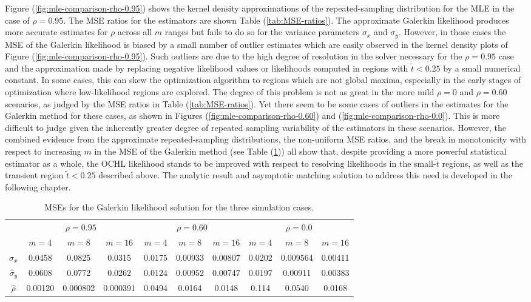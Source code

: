 Figure (\ref{fig:mle-comparison-rho-0.95}) shows the kernel density
approximations of the repeated-sampling distribution for the MLE in
the case of $\rho=0.95$. The MSE ratios for the estimators are shown
Table (\ref{tab:MSE-ratios}). The approximate Galerkin likelihood
produces more accurate estimates for $\rho$ across all $m$ ranges but
fails to do so for the variance parameters $\sigma_x$ and
$\sigma_y$. However, in those cases the MSE of the Galerkin likelihood
is biased by a small number of outlier estimates which are easily
observed in the kernel density plots of Figure
(\ref{fig:mle-comparison-rho-0.95}). Such outliers are due to the high
degree of resolution in the solver necessary for the $\rho=0.95$ case
and the approximation made by replacing negative likelihood values or
likelihoods computed in regions with $\tilde{t} < 0.25$ by a small
numerical constant. In some cases, this can skew the optimization
algorithm to regions which are not global maxima, especially in the
early stages of optimization where low-likelihood regions are
explored. The degree of this problem is not as great in the more mild
$\rho =0$ and $\rho = 0.60$ scenarios, as judged by the MSE ratios in
Table (\ref{tab:MSE-ratios}). Yet there seem to be some cases of
outliers in the estimates for the Galerkin method for these cases, as
shown in Figures (\ref{fig:mle-comparison-rho-0.60}) and
(\ref{fig:mle-comparison-rho-0.0}). This is more difficult to judge
given the inherently greater degree of repeated sampling variability
of the estimators in these scenarios. However, the combined evidence
from the approximate repeated-sampling distributions, the non-uniform
MSE ratios, and the break in monotonicity with respect to increasing
$m$ in the MSE of the Galerkin method (see Table (\ref{tab:MSEs})) all
show that, despite providing a more powerful statistical estimator as
a whole, the OCHL likelihood stands to be improved with respect to
resolving likelihoods in the small-$\tilde{t}$ regions, as well as the
transient region $\tilde{t} < 0.25$ described above. The analytic
result and asymptotic matching solution to address this need is
developed in the following chapter.

\begin{table}
  \centering
  \begin{tabular}{cccc|ccc|ccc}
    &  \multicolumn{3}{c}{$\rho=0.95$} & \multicolumn{3}{c}{$\rho=0.60$} &  \multicolumn{3}{c}{$\rho=0.0$}\\
    & $m=4$ & $m=8$ & $m=16$ & $m=4$ & $m=8$ & $m=16$ & $m=4$ & $m=8$ & $m=16$ \\
    \hline
    $\hat{\sigma}_x$ & 0.0458 & 0.0825 & 0.0315 &  0.0175  & 0.00933 & 0.00807  & 0.0202 & 0.009564 & 0.00411 \\
    \hline
    $\hat{\sigma}_y$ & 0.0608 & 0.0772 & 0.0262  & 0.0124  & 0.00952 & 0.00747  & 0.0197 & 0.00911  & 0.00383 \\
    \hline
    $\hat{\rho}$ & 0.00120 & 0.000802 & 0.000391 & 0.0494  & 0.0164 & 0.0148 & 0.114 & 0.0540 & 0.0168
  \end{tabular}
  \caption{MSEs for the Galerkin likelihood solution for the three simulation cases.}
  \label{tab:MSEs}
\end{table}

